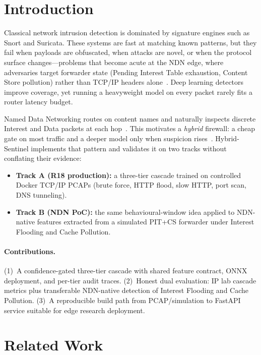 \documentclass[10pt,conference]{IEEEtran}
\begin{document}
\section{Introduction}
\label{sec:intro}

Classical network intrusion detection is dominated by signature engines
such as Snort and Suricata. These systems are fast at matching known
patterns, but they fail when payloads are obfuscated, when attacks are
novel, or when the protocol surface changes---problems that become acute
at the NDN edge, where adversaries target forwarder state (Pending
Interest Table exhaustion, Content Store pollution) rather than TCP/IP
headers alone~\cite{ndn,afiha}. Deep learning detectors improve
coverage, yet running a heavyweight model on every packet rarely fits a
router latency budget.

Named Data Networking routes on content names and naturally inspects
discrete Interest and Data packets at each hop~\cite{ndn}. This
motivates a \emph{hybrid} firewall: a cheap gate on most traffic and a
deeper model only when suspicion rises~\cite{tcl-wiki}.
Hybrid-Sentinel implements that pattern and validates it on two tracks
without conflating their evidence:
\begin{itemize}
  \item \textbf{Track A (R18 production):} a three-tier cascade trained
        on controlled Docker TCP/IP PCAPs (brute force, HTTP flood, slow
        HTTP, port scan, DNS tunneling).
  \item \textbf{Track B (NDN PoC):} the same behavioural-window idea
        applied to NDN-native features extracted from a simulated PIT+CS
        forwarder under Interest Flooding and Cache Pollution.
\end{itemize}

\paragraph{Contributions.}
(1)~A confidence-gated three-tier cascade with shared feature contract,
ONNX deployment, and per-tier audit traces. (2)~Honest dual evaluation:
IP lab cascade metrics plus transferable NDN-native detection of Interest
Flooding and Cache Pollution. (3)~A reproducible build path from
PCAP/simulation to FastAPI service suitable for edge research deployment.

\section{Related Work}
\label{sec:related}
\end{document}
